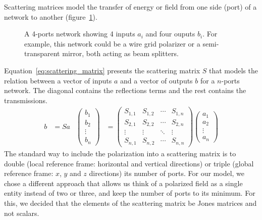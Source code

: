 \documentclass[a4paper,11pt]{article}
\begin{document}
Scattering matrices \cite{siegman1986lasers} model the transfer of energy or field from one side (port) of a network to another (figure~\ref{fig:ports}).
\begin{figure}[hbtp]
    \centering
    
    \caption{\label{fig:ports}A 4-ports network showing 4 inputs $a_i$ and four ouputs $b_i$.  For example, this network could be a wire grid polarizer or a semi-transparent mirror, both acting as beam splitters.}
\end{figure}
Equation~\ref{eq:scattering_matrix} presents the scattering matrix $S$ that models the relation between a vector of inputs $a$ and a vector of outputs $b$ for a $n$-ports network.
The diagonal contains the reflections terms and the rest contains the transmissions.
\begin{align}
    b &= S a
    &
    \begin{pmatrix}
        b_1\\
        b_2\\
        \vdots\\
        b_n
    \end{pmatrix}
    &=
    \begin{pmatrix}
        S_{1, 1} & S_{1, 2} & \cdots & S_{1, n} \\
        S_{2, 1} & S_{2, 2} & \cdots & S_{2, n} \\
        \vdots   & \vdots   & \ddots & \vdots   \\
        S_{n, 1} & S_{n, 2} & \cdots & S_{n, n}
    \end{pmatrix}
    \begin{pmatrix}
        a_1\\
        a_2\\
        \vdots\\
        a_n
    \end{pmatrix}
    \label{eq:scattering_matrix}
\end{align}
The standard way to include the polarization into a scattering matrix is to double (local reference frame: horizontal and vertical directions) or triple (global reference frame: $x$, $y$ and $z$ directions) its number of ports.
For our model, we chose a different approach that allows us think of a polarized field as a single entity instead of two or three, and keep the number of ports to its minimum.
For this, we decided that the elements of the scattering matrix be Jones matrices and not scalars.
\end{document}
